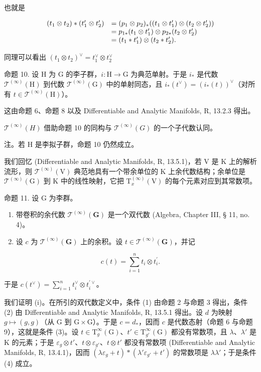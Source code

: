 也就是

\[
\begin{array}{r l} (t _ {1} \otimes t _ {2}) * (t _ {1} ^ {\prime} \otimes t _ {2} ^ {\prime}) & = (p _ {1} \otimes p _ {2}) _ {*} ((t _ {1} \otimes t _ {1} ^ {\prime}) \otimes (t _ {2} \otimes t _ {2} ^ {\prime})) \\ & = p _ {1 *} (t _ {1} \otimes t _ {1} ^ {\prime}) \otimes p _ {2 *} (t _ {2} \otimes t _ {2} ^ {\prime}) \\ & = (t _ {1} * t _ {1} ^ {\prime}) \otimes (t _ {2} * t _ {2} ^ {\prime}). \end{array}
\]

同理可以看出 \((t_1\otimes t_2)^\vee = t_1^\vee \otimes t_2^\vee\)

命题 10. 设 H 为 G 的李子群，\(i: \mathrm{H} \to \mathrm{G}\) 为典范单射。于是 \(i_*\) 是代数 \(\mathcal{T}^{(\infty)}(\mathrm{H})\) 到代数 \(\mathcal{T}^{(\infty)}(\mathrm{G})\) 中的单射同态，且 \(i_*(t^\vee) = (i_*(t))^{\vee}\)（对所有 \(t \in \mathcal{T}^{(\infty)}(\mathrm{H})\)）。

这由命题 6、命题 8 以及 Differentiable and Analytic Manifolds, R, 13.2.3 得出。

\(\mathcal{T}^{(\infty)}(H)\) 借助命题 10 的同构与 \(\mathcal{T}^{(\infty)}(G)\) 的一个子代数认同。

注。若 H 是李拟子群，命题 10 仍然成立。

我们回忆 (Differentiable and Analytic Manifolds, R, 13.5.1)，若 V 是 K 上的解析流形，则 \(\mathcal{T}^{(\infty)}(\mathrm{V})\) 典范地具有一个带余单位的 K 上余代数结构；余单位是 \(\mathcal{T}^{(\infty)}(\mathrm{G})\) 到 K 中的线性映射，它把 \(\mathrm{T}_x^{(\infty)}(\mathrm{V})\) 的每个元素对应到其常数项。

命题 11. 设 G 为李群。

\begin{enumerate}
\def\labelenumi{(\roman{enumi})}
\item
  带卷积的余代数 \(\mathcal{T}^{(\infty)}(\mathbf{G})\) 是一个双代数 (Algebra, Chapter III, § 11, no. 4)。
\item
  设 \(c\) 为 \(\mathcal{T}^{(\infty)}(\mathbf{G})\) 上的余积。设 \(t \in \mathcal{T}^{(\infty)}(\mathbf{G})\)，并记
\end{enumerate}

\[
c (t) = \sum_ {i = 1} ^ {n} t _ {i} \otimes t _ {i} ^ {\prime}.
\]

于是 \(c(t^{\vee}) = \sum_{i=1}^{n} t_{i}^{\vee} \otimes t_{i}^{\prime\vee}\)。

我们证明 (i)。在所引的双代数定义中，条件 (1) 由命题 2 与命题 3 得出，条件 (2) 由 Differentiable and Analytic Manifolds, R, 13.5.1 得出。设 \(d\) 为映射 \(g \mapsto (g, g)\)（从 G 到 \(\mathrm{G} \times \mathrm{G}\)）。于是 \(c = d_{*}\)，因而 \(c\) 是代数态射（命题 6 与命题 9），这就是条件 (3)。设 \(t \in \mathrm{T}_{g}^{\infty}(\mathrm{G})\)、\(t' \in \mathrm{T}_{g'}^{\infty}(\mathrm{G})\) 都没有常数项，且 \(\lambda\)、\(\lambda'\) 是 K 的元素；于是 \(\varepsilon_{g} \otimes t'\)、\(t \otimes \varepsilon_{g'}\)、\(t \otimes t'\) 都没有常数项 (Differentiable and Analytic Manifolds, R, 13.4.1)，因而 \((\lambda\varepsilon_{g} + t) * (\lambda' \varepsilon_{g'} + t')\) 的常数项是 \(\lambda\lambda'\)；于是条件 (4) 成立。

